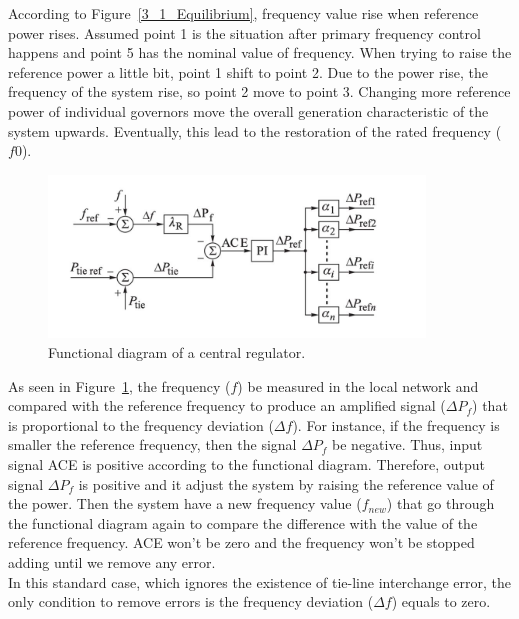 According to Figure~\ref{3_1_Equilibrium}, frequency value rise when reference power rises. Assumed point 1 is the situation after primary frequency control happens and point 5 has the nominal value of frequency. When trying to raise the reference power a little bit, point 1 shift to point 2. Due to the power rise, the frequency of the system rise, so point 2 move to point 3. Changing more reference power of individual governors move the overall generation characteristic of the system upwards. Eventually, this lead to the restoration of the rated frequency ($f0$).\\

\begin{figure}[htb]
\centering
\includegraphics[width = 0.891\textwidth]{figure/3_1_Functional.png}
\caption{Functional diagram of a central regulator.}
\label{3_1_Functional}
\end{figure}

As seen in Figure~\ref{3_1_Functional}, the frequency ($f$) be measured in the local network and compared with the reference frequency to produce an amplified signal ($\Delta P_f$) that is proportional to the frequency deviation ($\Delta f$). For instance, if the frequency is smaller the reference frequency, then the signal $\Delta P_f$ be negative. Thus, input signal ACE is positive according to the functional diagram. Therefore, output signal $\Delta P_f$ is positive and it adjust the system by raising the reference value of the power. Then the system have a new frequency value ($f_{new}$) that go through the functional diagram again to compare the difference with the value of the reference frequency. ACE won’t be zero and the frequency won’t be stopped adding until we remove any error.\\

In this standard case, which ignores the existence of tie-line interchange error, the only condition to remove errors is the frequency deviation ($\Delta f$) equals to zero.\\

